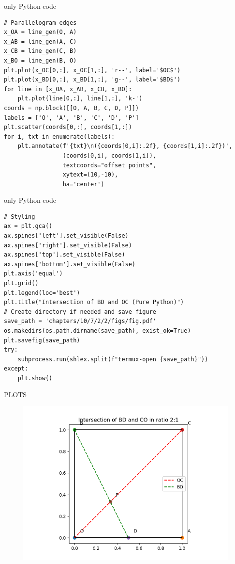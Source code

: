 \documentclass{beamer}
\begin{document}
\begin{frame}[fragile]{only Python code}
\begin{lstlisting}
# Parallelogram edges
x_OA = line_gen(O, A)
x_AB = line_gen(A, C)
x_CB = line_gen(C, B)
x_BO = line_gen(B, O)
plt.plot(x_OC[0,:], x_OC[1,:], 'r--', label='$OC$')
plt.plot(x_BD[0,:], x_BD[1,:], 'g--', label='$BD$')
for line in [x_OA, x_AB, x_CB, x_BO]:
    plt.plot(line[0,:], line[1,:], 'k-')
coords = np.block([[O, A, B, C, D, P]])
labels = ['O', 'A', 'B', 'C', 'D', 'P']
plt.scatter(coords[0,:], coords[1,:])
for i, txt in enumerate(labels):
    plt.annotate(f'{txt}\n({coords[0,i]:.2f}, {coords[1,i]:.2f})',
                 (coords[0,i], coords[1,i]),
                 textcoords="offset points",
                 xytext=(10,-10),
                 ha='center')
\end{lstlisting}
\end{frame}
\begin{frame}[fragile]{only Python code}
\begin{lstlisting}
# Styling
ax = plt.gca()
ax.spines['left'].set_visible(False)
ax.spines['right'].set_visible(False)
ax.spines['top'].set_visible(False)
ax.spines['bottom'].set_visible(False)
plt.axis('equal')
plt.grid()
plt.legend(loc='best')
plt.title("Intersection of BD and OC (Pure Python)")
# Create directory if needed and save figure
save_path = 'chapters/10/7/2/2/figs/fig.pdf'
os.makedirs(os.path.dirname(save_path), exist_ok=True)
plt.savefig(save_path)
try:
    subprocess.run(shlex.split(f"termux-open {save_path}"))
except:
    plt.show()
\end{lstlisting}
\end{frame}
\begin{frame}[fragile]{PLOTS}
\begin{figure}
    \centering
    \includegraphics[width=0.9\columnwidth]{figs/fig51.png}
    \caption{}
    \label{fig:placeholder}
\end{figure}
\end{frame}
\end{document}
